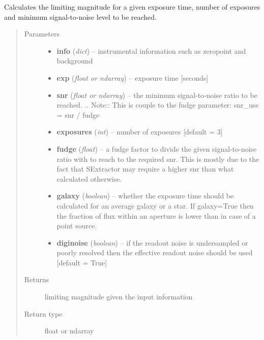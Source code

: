 \documentclass[a4paper,12pt,english]{sphinxmanual}
\begin{document}

\begin{fulllineitems}
\label{ETC:analysis.ETC.limitingMagnitude}
Calculates the limiting magnitude for a given exposure time, number of exposures and minimum signal-to-noise
level to be reached.
\begin{quote}\begin{description}
\item[{Parameters}] \leavevmode\begin{itemize}
\item {} 
\textbf{info} (\emph{dict}) -- instrumental information such as zeropoint and background

\item {} 
\textbf{exp} (\emph{float or ndarray}) -- exposure time {[}seconds{]}

\item {} 
\textbf{snr} (\emph{float or ndarray}) -- the minimum signal-to-noise ratio to be reached.
.. Note:: This is couple to the fudge parameter: snr\_use = snr / fudge

\item {} 
\textbf{exposures} (\emph{int}) -- number of exposures {[}default = 3{]}

\item {} 
\textbf{fudge} (\emph{float}) -- a fudge factor to divide the given signal-to-noise ratio with to reach to the required snr.
This is mostly due to the fact that SExtractor may require a higher snr than what calculated
otherwise.

\item {} 
\textbf{galaxy} (\emph{boolean}) -- whether the exposure time should be calculated for an average galaxy or a star.
If galaxy=True then the fraction of flux within an aperture is lower than in case of a point source.

\item {} 
\textbf{diginoise} (\emph{boolean}) -- if the readout noise is undersampled or poorly resolved then the effective readout noise
should be used {[}default = True{]}

\end{itemize}

\item[{Returns}] \leavevmode
limiting magnitude given the input information

\item[{Return type}] \leavevmode
float or ndarray

\end{description}\end{quote}

\end{fulllineitems}
\end{document}
